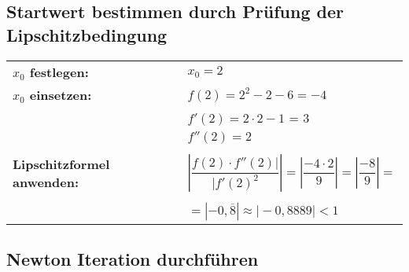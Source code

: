 \documentclass[a4paper]{scrartcl}
\begin{document}
	\subsection{Startwert bestimmen durch Prüfung der Lipschitzbedingung}
		
		
		\begin{tabular}{lll}
		\\
		\textbf{$x_{0}$ festlegen:} & & $x_{0} = 2$ \\
		\textbf{$x_{0}$ einsetzen:} & & $f(2) = 2^2-2-6 = -4$ \\
		\textbf{} & & $f'(2) = 2 \cdot 2 -1$ = 3 \\
		\textbf{} & & $f''(2) = 2$ \\ \\
		
		\textbf{Lipschitzformel anwenden:} & &
			$
			\left| \dfrac{f(2) \cdot f''(2) \vert}{\vert f'(2)^{2}}\right| = 
			\left| \dfrac{ -4 \cdot 2}{9}\right| =
			\left| \dfrac{-8}{9}\right| =$ \\ \\
			& &
			$
			= \left| -0,\overline{8}\right| \approx \vert -0,8889 \vert   < 1 
			$
			
		\end{tabular}
		
	\subsection{Newton Iteration durchführen}
		
\end{document}
